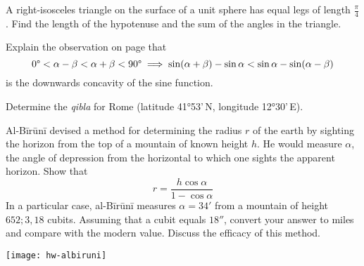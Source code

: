 \begin{exercises}{}{}
\exstart A right-isosceles triangle on the surface of a unit sphere has equal legs of length $\frac\pi 4$. Find the length of the hypotenuse and the sum of the angles in the triangle. 
\begin{enumerate}\setcounter{enumi}{1}
  \item Explain the observation on page \pageref{pg:sineconcave} that
	\[\ang 0<\alpha-\beta<\alpha+\beta<\ang{90}\implies\sin(\alpha+\beta)-\sin\alpha<\sin\alpha-\sin(\alpha-\beta)\]
	is the downwards concavity of the sine function.

  \item%
	Determine the \emph{qibla} for Rome (latitude \ang{41}53'\,N, longitude \ang{12}30'\,E).
  
  \begin{minipage}[t]{0.7\linewidth}\vspace{0pt}
	\item%
	Al-Bīrūnī devised a method for determining the radius $r$ of the earth by sighting the horizon from the top of a mountain of known height $h$. He would measure $\alpha$, the angle of depression from the horizontal to which one sights the apparent horizon. Show that
  \[r=\frac{h\cos\alpha}{1-\cos\alpha}\]
  In a particular case, al-Bīrūnī measures $\alpha=34'$ from a mountain of height $652;3,18$ cubits. Assuming that a cubit equals $18''$, convert your answer to miles and compare with the modern value. Discuss the efficacy of this method.
  \end{minipage}\hfill\begin{minipage}[t]{0.29\linewidth}\vspace{0pt}
  \flushright\texttt{[image: hw-albiruni]}
  \end{minipage}
  
\end{enumerate}
\end{exercises}